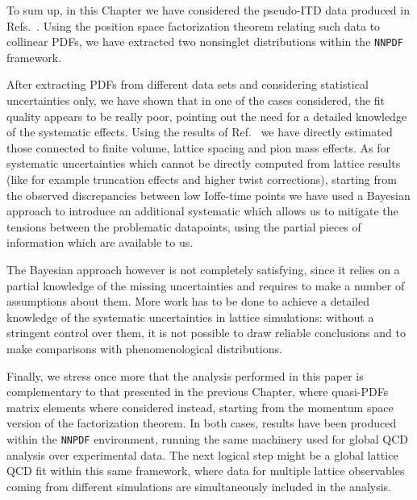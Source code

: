 To sum up, in this Chapter
we have considered the pseudo-ITD data produced in Refs.~\cite{Joo:2019jct,Joo:2020spy}. Using the
position space factorization theorem relating such data to collinear PDFs, we have extracted two nonsinglet distributions 
within the {\tt NNPDF} framework. 

%
After extracting PDFs from different data sets and 
considering statistical uncertainties only, 
we have shown that in one of the cases considered, the fit quality appears to be really poor,
pointing out the need for a detailed knowledge of the systematic effects.
Using the results of Ref.~\cite{Joo:2019jct,Joo:2020spy} we have directly estimated those connected to finite volume, lattice spacing
and pion mass effects. As for systematic uncertainties which cannot be directly computed from lattice results (like
for example truncation effects and higher twist corrections), starting from
the observed discrepancies between low Ioffe-time points we have used a Bayesian approach to introduce an additional systematic 
which allows us to mitigate the tensions between the problematic datapoints, using the partial pieces of information which are available to us.

%
The Bayesian approach however is not completely satisfying, since it relies on a partial knowledge of the
missing uncertainties and requires to make a number of assumptions about them. More work has to be done
to achieve a detailed knowledge of the systematic uncertainties in lattice simulations: 
without a stringent control over them, it is not possible to draw reliable conclusions and
to make comparisons with phenomenological distributions. 

%
Finally, we stress once more that the analysis performed in this paper is complementary to that 
presented in the previous Chapter, where quasi-PDFs matrix elements where considered instead, 
starting from the momentum space version of the factorization theorem. 
In both cases, results have been produced within the {\tt NNPDF} environment,
running the same machinery used for global QCD analysis over experimental data. 
The next logical step might be a global lattice QCD fit within this same framework, where data for multiple lattice observables 
coming from different simulations are simultaneously included in the analysis.